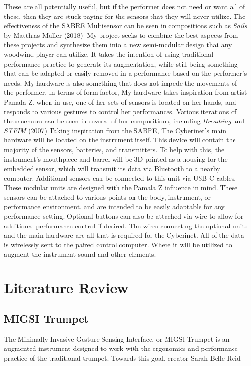 These are all potentially useful, but if the performer does not need or want all of these, then they are stuck paying for the sensors that they will never utilize. The effectiveness of the SABRE Multisensor can be seen in compositions such as \textit{Sails} by Matthias Muller (2018). 
My project seeks to combine the best aspects from these projects and synthesize them into a new semi-modular design that any woodwind player can utilize. It takes the intention of using traditional performance practice to generate its augmentation, while still being something that can be adapted or easily removed in a performance based on the performer’s needs. My hardware is also something that does not impede the movements of the performer. In terms of form factor, My hardware takes inspiration from artist Pamala
Z. when in use, one of her sets of sensors is located on her hands, and responds to various gestures to control her performances. Various iterations of these sensors can be seen in several of her compositions, including \textit{Breathing} and \textit{STEIM} (2007)
Taking inspiration from the SABRE, The Cyberinet's main hardware will be located on the instrument itself. This device will contain the majority of the sensors, batteries, and transmitters. To help with this, the instrument’s mouthpiece and barrel will be 3D printed as a housing for the embedded sensor, which will transmit its data via Bluetooth to a nearby computer.
Additional sensors can be connected to this unit via USB-C cables. These modular units are designed with the Pamala Z influence in mind. These sensors can be attached to various points on the body, instrument, or performance environment, and are intended to be easily adaptable for any performance setting.
Optional buttons can also be attached via wire to allow for additional performance control if desired. The wires connecting the optional units and the main hardware are all that is required for the Cyberinet. All of the data is wirelessly sent to the paired control computer. Where it will be utilized to augment the instrument sound and other elements.

\chapter{Literature Review}

\section{MIGSI Trumpet}
The Minimally Invasive Gesture Sensing Interface, or MIGSI Trumpet is an augmented instrument designed to work with the ergonomics and performance practice of the traditional trumpet. Towards this goal, creator Sarah Belle Reid 

